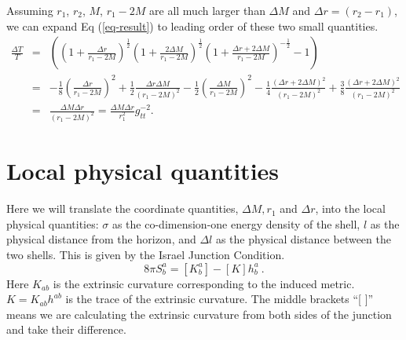 \documentclass[aps,showpacs,onecolumn,floats,prd,superscriptaddress,nofootinbib]{revtex4-1}
\begin{document}
Assuming $r_1$, $r_2$, $M$, $r_1-2M$ are all much larger than $\Delta M$ and $\Delta r=(r_2-r_1)$, we can expand Eq (\ref{eq-result}) to leading order of these two small quantities.
\begin{eqnarray}
	\frac{\Delta T}{T} & = & 
	\left( \left( 1+ \frac{\Delta r}{r_1 - 2M} \right)^\frac{1}{2} \left( 1 + \frac{2\Delta M}{r_1 - 2M} \right)^\frac{1}{2} \left( 1 + \frac{\Delta r + 2 \Delta M}{r_1 - 2M} \right)^{-\frac{1}{2}} - 1 \right)	\nonumber	\\
	& = & - \frac{1}{8} \left( \frac{\Delta r}{r_1 - 2M} \right)^2 + 
	\frac{1}{2} \frac{\Delta r \Delta M}{(r_1 - 2M)^2} - 
	\frac{1}{2} \left( \frac{\Delta M}{r_1 - 2M} \right)^2 - 
	\frac{1}{4} \frac{( \Delta r + 2 \Delta M)^2}{(r_1 - 2M)^2} + 
	\frac{3}{8} \frac{(\Delta r+ 2 \Delta M)^2}{(r_1 - 2M)^2} 	\nonumber	\\
	& = & \frac{\Delta M \Delta r}{(r_1 - 2M)^2} = \frac{\Delta M \Delta r}{r_1^2} g_{tt}^{-2}.
\end{eqnarray}
	
%
%

\section{Local physical quantities}
\label{finalEq}

Here we will translate the coordinate quantities, $\Delta M, r_1$ and $\Delta r$, into the local physical quantities: $\sigma$ as the co-dimension-one energy density of the shell, $l$ as the physical distance from the horizon, and $\Delta l$ as the physical distance between the two shells.
This is given by the Israel Junction Condition.
\begin{equation}
	8 \pi S^a_b = [K^a_b] - [K]h^a_b~.	\label{IJC}
\end{equation}	
Here $K_{ab}$ is the extrinsic curvature corresponding to the induced metric.
$K = K_{ab} h^{ab}$ is the trace of the extrinsic curvature.
The middle brackets ``[ ]'' means we are calculating the extrinsic curvature from both sides of the junction and take their difference.
\end{document}
